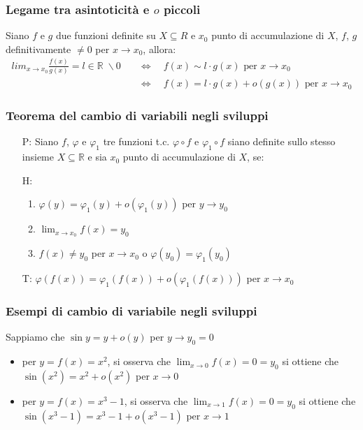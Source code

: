\documentclass[a4paper]{article}
\begin{document}
\subsubsection*{Legame tra asintoticità e \(o\) piccoli}
Siano \(f\) e \(g\) due funzioni definite su \(X \subseteq R\) e \(x_0\) punto di accumulazione di \(X\), \(f\), \(g\) definitivamente \(\neq 0\) per \(x \to x_0\), allora:
\begin{align*}
	lim_{x \to x_0} \frac{f(x)}{g(x)} = l \in \mathbb{R} \; \backslash 0 \quad &\Leftrightarrow \quad f(x) \sim l \cdot g(x) \text{ per } x \to x_0 \\
	&\Leftrightarrow \quad f(x) = l \cdot g(x) + o(g(x)) \text{ per } x \to x_0
\end{align*}

\subsubsection*{Teorema del cambio di variabili negli sviluppi}
\begin{itemize}
	\item[P:] Siano \(f\), \(\varphi\) e \(\varphi_1\) tre funzioni t.c. \(\varphi \circ f\) e \(\varphi_1 \circ f\) siano definite sullo stesso
	insieme \(X \subseteq \mathbb{R}\) e sia \(x_0\) punto di accumulazione di \(X\), se:
	\item[H:]
	\begin{enumerate}
		\item \(\varphi(y) = \varphi_1(y) + o(\varphi_1(y))\) per \(y \to y_0\)
		\item \(\displaystyle \lim_{x \to x_0} f(x) = y_0\)
		\item \(f(x) \neq y_0\) per \(x \to x_0\) o \(\varphi(y_0) = \varphi_1(y_0)\)
	\end{enumerate}
	\item[T:] \(\varphi(f(x)) = \varphi_1(f(x)) + o(\varphi_1(f(x)))\) per \(x \to x_0\)
\end{itemize}

\subsubsection*{Esempi di cambio di variabile negli sviluppi}
Sappiamo che \(\sin y = y + o(y)\) per \(y \to y_0 = 0\)
\begin{itemize}
	\item per \(y = f(x) = x^2\), si osserva che \(\displaystyle \lim_{x \to 0} f(x) = 0 = y_0\) si ottiene che \\ \(\sin(x^2) = x^2 + o(x^2)\) per \(x \to 0\)
	\item per \(y = f(x) = x^3 - 1\), si osserva che \(\displaystyle \lim_{x \to 1} f(x) = 0 = y_0\) si ottiene che \\ \(\sin(x^3 - 1) = x^3 - 1 + o(x^3 - 1)\) per \(x \to 1\)
\end{itemize}
\end{document}
